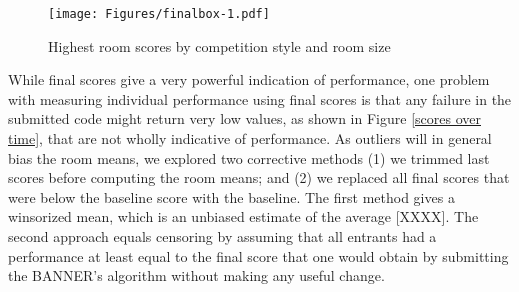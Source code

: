 \documentclass[10pt, titlepage]{article}
\begin{document}
\begin{figure}
\centering
\texttt{[image: Figures/finalbox-1.pdf]}
\caption{Highest room scores by competition style and room
size\label{scores}}
\end{figure}

While final scores give a very powerful indication of performance, one
problem with measuring individual performance using final scores is that
any failure in the submitted code might return very low values, as shown
in Figure \ref{scores over time}, that are not wholly indicative of
performance. As outliers will in general bias the room means, we
explored two corrective methods (1) we trimmed last scores before
computing the room means; and (2) we replaced all final scores that were
below the baseline score with the baseline. The first method gives a
winsorized mean, which is an unbiased estimate of the average
{[}XXXX{]}. The second approach equals censoring by assuming that all
entrants had a performance at least equal to the final score that one
would obtain by submitting the BANNER's algorithm without making any
useful change.
\end{document}
